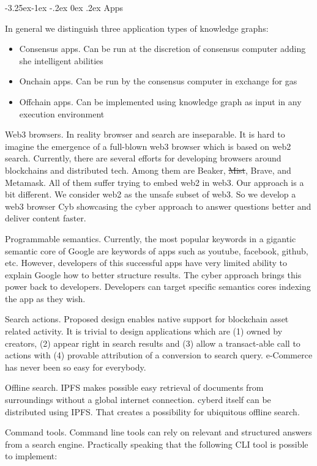 \documentclass[8pt,oneside]{amsart}
\makeatletter
\renewcommand\subsection{\@startsection{subsection}{2}{\z@}%
                                     {-3.25ex\@plus -1ex \@minus -.2ex}%
                                     {0ex \@plus .2ex}%
                                     {\play\Large}}%
\newcommand{\titleSection}[1]{\subsection{#1}}
\newcommand{\code}[1]{{\PlayBold #1}}
\makeatother
\begin{document}
\titleSection{Apps}\label{Applications of knowledge graph}

In general we distinguish three application types of knowledge graphs:
\begin{itemize}
\item Consensus apps. Can be run at the discretion of consensus computer adding she intelligent abilities
\item Onchain apps. Can be run by the consensus computer in exchange for gas
\item Offchain apps. Can be implemented using knowledge graph as input in any execution environment 
\end{itemize}

\code{Web3 browsers}. In reality browser and search are inseparable. It is hard to imagine the emergence of a full-blown web3 browser which is based on web2 search. Currently, there are several efforts for developing browsers around blockchains and distributed tech. Among them are Beaker, \sout{Mist}, Brave, and Metamask. All of them suffer trying to embed web2 in web3. Our approach is a bit different. We consider web2 as the unsafe subset of web3. So we develop a web3 browser Cyb showcasing the cyber approach to answer questions better and deliver content faster.

\code{Programmable semantics}. Currently, the most popular keywords in a gigantic semantic core of Google are keywords of apps such as youtube, facebook, github, etc. However, developers of this successful apps have very limited ability to explain Google how to better structure results. The cyber approach brings this power back to developers. Developers can target specific semantics cores indexing the app as they wish.

\code{Search actions}. Proposed design enables native support for blockchain asset related activity. It is trivial to design applications which are (1) owned by creators, (2) appear right in search results and (3) allow a transact-able call to actions with (4) provable attribution of a conversion to search query. e-Commerce has never been so easy for everybody.

\code{Offline search}. IPFS makes possible easy retrieval of documents from surroundings without a global internet connection. cyberd itself can be distributed using IPFS. That creates a possibility for ubiquitous offline search.

\code{Command tools}. Command line tools can rely on relevant and structured answers from a search engine. Practically speaking that the following CLI tool is possible to implement:
\end{document}
